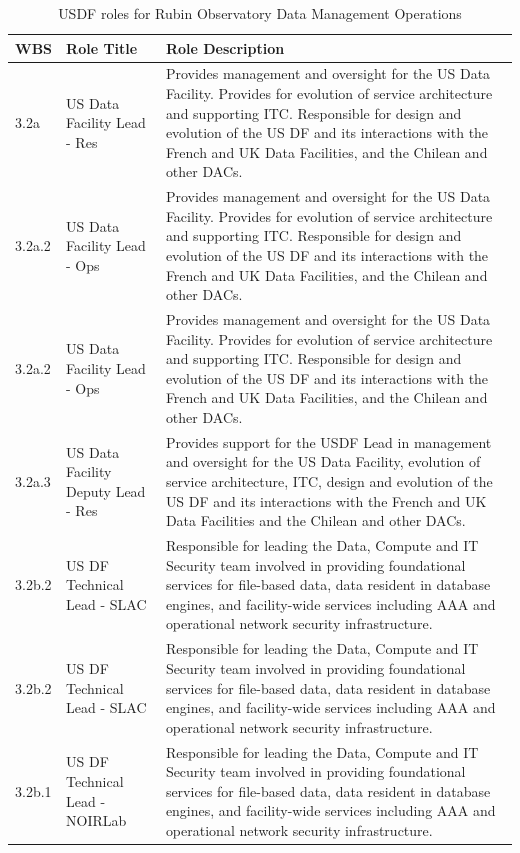 \normalsize \begin{longtable} {|p{}|p{}|p{}|} \caption{USDF roles for Rubin Observatory Data Management Operations \label{tab:usdfroles}}\\ 
\hline 
\textbf{WBS}&\textbf{Role Title}&\textbf{Role Description} \\ \hline
{3.2a}&{US Data Facility Lead - Res}&{Provides management and oversight for the US Data Facility. Provides for evolution of service architecture and supporting ITC. Responsible for design and evolution of the US DF and its interactions with the French and UK Data Facilities, and the Chilean and other DACs.} \\ \hline
{3.2a.2}&{US Data Facility Lead - Ops}&{Provides management and oversight for the US Data Facility. Provides for evolution of service architecture and supporting ITC. Responsible for design and evolution of the US DF and its interactions with the French and UK Data Facilities, and the Chilean and other DACs.} \\ \hline
{3.2a.2}&{US Data Facility Lead - Ops}&{Provides management and oversight for the US Data Facility. Provides for evolution of service architecture and supporting ITC. Responsible for design and evolution of the US DF and its interactions with the French and UK Data Facilities, and the Chilean and other DACs.} \\ \hline
{3.2a.3}&{US Data Facility Deputy Lead - Res}&{Provides support for the USDF Lead in management and oversight for the US Data Facility, evolution of service architecture, ITC, design and evolution of the US DF and its interactions with the French and UK Data Facilities and the Chilean and other DACs.} \\ \hline
{3.2b.2}&{US DF Technical Lead - SLAC}&{Responsible for leading the Data, Compute and IT Security team involved in providing foundational services for file-based data, data resident in database engines, and facility-wide services including AAA and operational network security infrastructure.} \\ \hline
{3.2b.2}&{US DF Technical Lead - SLAC}&{Responsible for leading the Data, Compute and IT Security team involved in providing foundational services for file-based data, data resident in database engines, and facility-wide services including AAA and operational network security infrastructure.} \\ \hline
{3.2b.1}&{US DF Technical Lead - NOIRLab}&{Responsible for leading the Data, Compute and IT Security team involved in providing foundational services for file-based data, data resident in database engines, and facility-wide services including AAA and operational network security infrastructure.} \\ \hline

\end{longtable}
